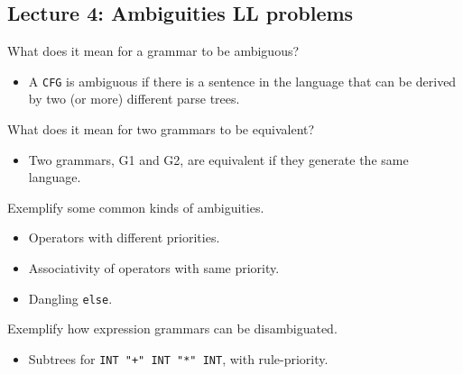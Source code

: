 \documentclass[11pt]{beamer}
\begin{document}
\subsection{Lecture 4: Ambiguities LL problems}
\begin{frame}

\begin{block}{What does it mean for a grammar to be ambiguous?}
\begin{itemize}
\item A \texttt{CFG} is ambiguous if there is a sentence in the language that can be derived by two (or more) different parse trees.
\end{itemize}
\end{block}


\begin{block}{What does it mean for two grammars to be equivalent?}
\begin{itemize}
\item Two grammars, G1 and G2, are equivalent if they generate the same language.
\end{itemize}
\end{block}

\begin{block}{Exemplify some common kinds of ambiguities.}
\begin{itemize}
\item Operators with different priorities.
\item Associativity of operators with same priority.
\item Dangling \texttt{else}.
\end{itemize}
\end{block}


\begin{block}{Exemplify how expression grammars can be disambiguated.}
\begin{itemize}
\item Subtrees for \texttt{INT "+" INT "*" INT}, with rule-priority.
\end{itemize}
\end{block}

\end{frame}
\end{document}
